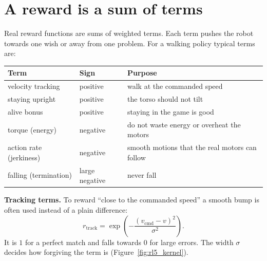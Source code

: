 \begin{center}
\label{fig:rl5_sparse}
\end{center}

\section*{A reward is a sum of terms}
Real reward functions are sums of weighted terms. Each term pushes the robot towards one wish or away from one problem. For a walking policy typical terms are:

\begin{center}
\renewcommand{\arraystretch}{1.3}
\begin{tabular}{p{4.6cm}p{3.6cm}p{4.6cm}}
\textbf{Term} & \textbf{Sign} & \textbf{Purpose}\\ \hline
velocity tracking & positive & walk at the commanded speed\\
staying upright & positive & the torso should not tilt\\
alive bonus & positive & staying in the game is good\\
torque (energy) & negative & do not waste energy or overheat the motors\\
action rate (jerkiness) & negative & smooth motions that the real motors can follow\\
falling (termination) & large negative & never fall\\
\end{tabular}
\end{center}

\textbf{Tracking terms.} To reward ``close to the commanded speed'' a smooth bump is often used instead of a plain difference:
\[
r_{\text{track}}=\exp\!\left(-\frac{(v_{\text{cmd}}-v)^2}{\sigma^2}\right).
\]
It is $1$ for a perfect match and falls towards $0$ for large errors. The width $\sigma$ decides how forgiving the term is (Figure~\ref{fig:rl5_kernel}).

